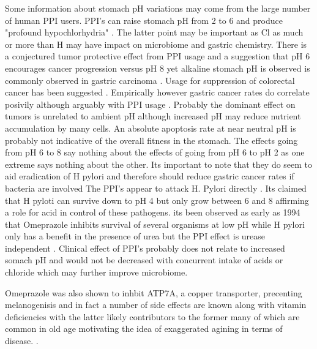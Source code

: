 {%
Some information about stomach pH variations may come
from the large number of human PPI users.
PPI's  can raise stomach pH from 2 to 6 and produce "profound 
hypochlorhydria" \cite{PMC4254461}. The latter point may be
important as Cl as much or more  than H may have impact on microbiome
and gastric chemistry. 
There is  a conjectured tumor protective effect from PPI usage
and  a suggestion
that pH 6 encourages cancer progression
versus pH 8 \cite{PMC7085403}
yet alkaline stomach pH is observed is commonly observed
in gastric carcinoma \cite{10.1007/978-4-431-68246-2_26}.
Usage for suppression of colorectal cancer has been suggested
\cite{Kim_Lee_Hong_Novel_Application_Proton_}.
Empirically however gastric cancer rates do correlate 
posivily although arguably with PPI usage
\cite{Waldum_Sordal_Fossmark_Proton_pump_inhibitors_PPIs_2018}
\cite{Segna_Brusselaers_Glaus_Association_between_proton_pump_2021}
\cite{PMC10308480}
.
Probably the dominant effect on tumors is unrelated to ambient
pH although increased pH may reduce nutrient
accumulation by many cells. An absolute apoptosis rate
at near neutral pH is probably not indicative of the
overall fitness in the stomach. 
The effects going from pH 6 to 8 say nothing about the effects
of going from pH 6 to pH 2 as one extreme says nothing about the other. 
Its important to note that they do seem to aid eradication of
H pylori and therefore should reduce gastric cancer rates
if bacteria are involved 
The PPI's appear to attack H. Pylori directly 
\cite{Saniee_Shahreza_Siavoshi_Negative_Effect_Protonpump_2016}
\cite{Atif_Hatefi_Arven_Consumption_antibacterial_2024}
. Its claimed that H pyloti can  survive down to pH 4 but only grow
between 6 and 8 \cite{Marcus2023} affirming a role for
acid in control of these pathogens. 
its been observed as early as  1994 that Omeprazole inhibits
survival of several organisms at low pH while H pylori
only has a benefit in the presence of urea
but the PPI effect is urease independent
\cite{McGowan_Cover_Blaser_proton_pump_inhibitor_1994}.
Clinical effect  of PPI's probably does not relate to increased
somach pH and would  not be decreased with concurrent
intake of acids or chloride which may further improve microbiome.

Omeprazole was also shown to inhbit ATP7A, a copper transporter,
precenting melanogenisis 
\cite{Matsui_Petris_Niki_Omeprazole_Gastric_Proton_2015}
and in fact a number of side effects are known 
along with vitamin deficiencies 
\cite{PMC10248387} with the latter likely contributors to the former
many of which are common in old age motivating the idea of exaggerated
agining in terms of disease.  .

}

